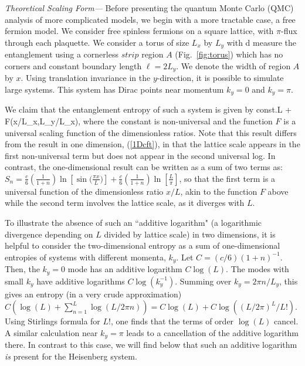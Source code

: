\documentclass[prl,aps,twocolumn,floatfix,amsmath,amssymb,superscriptaddress,tightenlines]{revtex4}
\begin{document}
{\it Theoretical Scaling Form---}
Before presenting the quantum Monte Carlo (QMC) analysis of more complicated models, we begin with a more tractable case, a free fermion model.
We consider free spinless fermions on a square lattice, with $\pi$-flux through each plaquette.  We consider a torus of size $L_x$ by $L_y$ with
d measure the entanglement %
using a cornerless $strip$ region $A$ (Fig.~\ref{fig:torus}) which has no corners and constant boundary length $\ell = 2L_y$.
We denote the width of region $A$ by $x$.
Using translation invariance in the $y$-direction, it is possible to simulate large systems.  This system has Dirac points near momentum $k_y=0$ and $k_y=\pi$.

We claim that the entanglement entropy of such a system is given by
\be
{\rm const.}\times L + F(x/L_x,L_y/L_x),
\ee
where the constant is non-universal and the function $F$ is a universal scaling function of the dimensionless ratios.  Note that this result differs
from the result in one dimension, (\ref{1Dcft}), in that the lattice scale appears in the first non-universal term but does not appear in the second universal log.  In contrast, the one-dimensional result can be written as a sum of two terms as:
$S_n = \frac{c}{6}\left({ \frac{1}{1+n} }\right) \ln[\sin\big( \frac{\pi x}{L} \big)]+\frac{c}{6}\left(\frac{1}{1+n}\right)\ln[\frac{L}{\pi}]$, so that the first term is a universal function of the dimensionless ratio $x/L$, akin to the function $F$ above while the second term involves the lattice scale, as it diverges with $L$.

To illustrate the absence of such an ``additive logarithm" (a logarithmic divergence depending on $L$ divided by lattice scale) in two dimensions, it is helpful to 
consider the two-dimensional entropy as a sum of one-dimensional entropies of systems with different momenta, $k_y$.  Let $C=(c/6)(1+n)^{-1}$.  Then, the $k_y=0$ mode has an additive logarithm $C \log(L)$.  The modes with small $k_y$ have additive logarithms $C \log(k_y^{-1})$.  Summing over $k_y=2\pi n/L_y$, this gives an entropy (in a very crude approximation) $C (\log(L)+\sum_{n=1}^{L} \log(L/2 \pi n))=C\log(L) + C\log((L/2\pi)^L/L!)$.  Using Stirlings formula for $L!$, one finds that the terms of order $\log(L)$ cancel.  A similar calculation near $k_y=\pi$ leads to a cancellation of the additive logarithm there.
In contrast to this case, we will find below that such an additive logarithm {\it is} present for the Heisenberg system.
\end{document}
